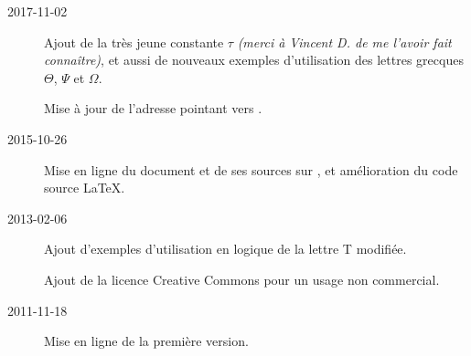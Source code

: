 
\begin{description}
	\item[2017-11-02] Ajout de la très jeune constante $\tau$ \emph{(merci à Vincent D. de me l'avoir fait connaître)}, et aussi de nouveaux exemples d'utilisation des lettres grecques $\Theta$, $\Psi$ et $\Omega$.
	
	Mise à jour de l'adresse pointant vers .

	\item[2015-10-26] Mise en ligne du document et de ses sources sur , et amélioration du code source \LaTeX.

	\item[2013-02-06] Ajout d'exemples d'utilisation en logique de la lettre T modifiée.

Ajout de la licence Creative Commons pour un usage non commercial.

	\item[2011-11-18] Mise en ligne de la première version.
\end{description}